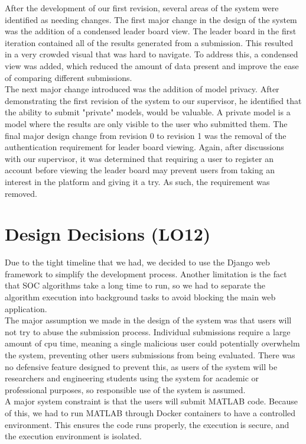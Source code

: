 \documentclass{article}
\begin{document}
After the development of our first revision, several areas of the system were identified as needing changes. The first major change in the design of the system was the addition of a condensed leader board view. The leader board in the first iteration contained all of the results generated from a submission. This resulted in a very crowded visual that was hard to navigate. To address this, a condensed view was added, which reduced the amount of data present and improve the ease of comparing different submissions. \\

The next major change introduced was the addition of model privacy. After demonstrating the first revision of the system to our supervisor, he identified that the ability to submit "private" models, would be valuable. A private model is a model where the results are only visible to the user who submitted them. The final major design change from revision 0 to revision 1 was the removal of the authentication requirement for leader board viewing. Again, after discussions with our supervisor, it was determined that requiring a user to register an account before viewing the leader board may prevent users from taking an interest in the platform and giving it a try. As such, the requirement was removed.


\section{Design Decisions (LO12)}

Due to the tight timeline that we had, we decided to use the Django web framework to simplify the development process. Another limitation is the fact that SOC algorithms take a long time to run, so we had to separate the algorithm execution into background tasks to avoid blocking the main web application.\\

The major assumption we made in the design of the system was that users will not try to abuse the submission process. Individual submissions require a large amount of cpu time, meaning a single malicious user could potentially overwhelm the system, preventing other users submissions from being evaluated. There was no defensive feature designed to prevent this, as users of the system will be researchers and engineering students using the system for academic or professional purposes, so responsible use of the system is assumed.\\

A major system constraint is that the users will submit MATLAB code. Because of this, we had to run MATLAB through Docker containers to have a controlled environment. This ensures the code runs properly, the execution is secure, and the execution environment is isolated.
\end{document}
